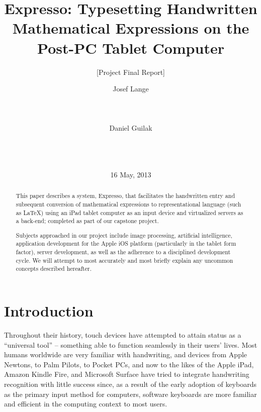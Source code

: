 \documentclass{acm_proc_article-sp}
\begin{document}
\title{ Expresso: Typesetting Handwritten Mathematical Expressions on the Post-PC Tablet Computer }
\subtitle{ [Project Final Report] }


\author{
\alignauthor
Josef Lange\\
       \\
       \\
       \\
\alignauthor       
Daniel Guilak\\
       \\
       \\
       \\
}
       
\date{16 May, 2013}

\maketitle

\begin{abstract}
This paper describes a system, Expresso, that facilitates the handwritten entry and subsequent conversion of mathematical expressions to representational language (such as \LaTeX{}) using an iPad tablet computer as an input device and virtualized servers as a back-end; completed as part of our capstone project.

Subjects approached in our project include image processing, artificial intelligence, application development for the Apple iOS platform (particularly in the tablet form factor), server development, as well as the adherence to a disciplined development cycle. We will attempt to most accurately and most briefly explain any uncommon concepts described hereafter.
\end{abstract}

\section{Introduction}
Throughout their history, touch devices have attempted to attain status as a ``universal tool'' -- something able to function seamlessly in their users' lives. Most humans worldwide are very familiar with handwriting, and devices from Apple Newtons, to Palm Pilots, to Pocket PCs, and now to the likes of the Apple iPad, Amazon Kindle Fire, and Microsoft Surface have tried to integrate handwriting recognition with little success since, as a result of the early adoption of keyboards as the primary input method for computers, software keyboards are more familiar and efficient in the computing context to most users.
\end{document}
